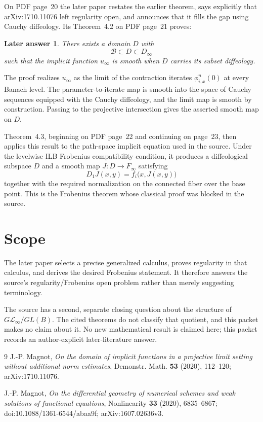 \documentclass[11pt]{article}
\newtheorem*{answer}{Later answer}
\begin{document}
On PDF page~20 the later paper restates the earlier theorem, says explicitly
that arXiv:1710.11076 left regularity open, and announces that it fills the
gap using Cauchy diffeology.  Its Theorem~4.2 on PDF page~21 proves:

\begin{answer}
There exists a domain $D$ with
\[
 \mathcal B\subset D\subset D_\infty
\]
such that the implicit function $u_\infty$ is smooth when $D$ carries its
subset diffeology.
\end{answer}

The proof realizes $u_\infty$ as the limit of the contraction iterates
$\phi_{i,x}^n(0)$ at every Banach level.  The parameter-to-iterate map is
smooth into the space of Cauchy sequences equipped with the Cauchy
diffeology, and the limit map is smooth by construction.  Passing to the
projective intersection gives the asserted smooth map on $D$.

Theorem~4.3, beginning on PDF page~22 and continuing on page~23, then applies
this result to the path-space implicit equation used in the source.  Under
the levelwise ILB Frobenius compatibility condition, it produces a
diffeological subspace $D$ and a smooth map $J:D\to F_\infty$ satisfying
\[
 D_1J(x,y)=f_i\bigl(x,J(x,y)\bigr)
\]
together with the required normalization on the connected fiber over the
base point.  This is the Frobenius theorem whose classical proof was blocked
in the source.

\section*{Scope}

The later paper selects a precise generalized calculus, proves regularity in
that calculus, and derives the desired Frobenius statement.  It therefore
answers the source's regularity/Frobenius open problem rather than merely
suggesting terminology.

The source has a second, separate closing question about the structure of
$G\mathcal L_\infty/GL(B)$.  The cited theorems do not classify that quotient,
and this packet makes no claim about it.  No new mathematical result is
claimed here; this packet records an author-explicit later-literature answer.

\begin{thebibliography}{9}
J.-P. Magnot,
\emph{On the domain of implicit functions in a projective limit setting
without additional norm estimates},
Demonstr. Math. \textbf{53} (2020), 112--120;
arXiv:1710.11076.

J.-P. Magnot,
\emph{On the differential geometry of numerical schemes and weak solutions
of functional equations},
Nonlinearity \textbf{33} (2020), 6835--6867;
doi:10.1088/1361-6544/abaa9f; arXiv:1607.02636v3.
\end{thebibliography}
\end{document}
